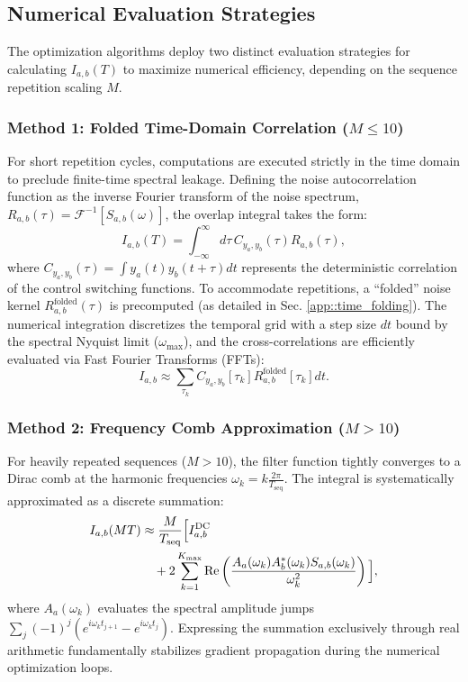 \documentclass[%
 reprint,
superscriptaddress,
 amsmath,amssymb,
 aps,
pra,
floatfix,
]{revtex4-2}
\begin{document}
\subsection{Numerical Evaluation Strategies}
The optimization algorithms deploy two distinct evaluation strategies for calculating $I_{a,b}(T)$ to maximize numerical efficiency, depending on the sequence repetition scaling $M$.

\subsubsection{Method 1: Folded Time-Domain Correlation ($M \le 10$)}
For short repetition cycles, computations are executed strictly in the time domain to preclude finite-time spectral leakage. Defining the noise autocorrelation function as the inverse Fourier transform of the noise spectrum, $R_{a,b}(\tau) = \mathcal{F}^{-1}[S_{a,b}(\omega)]$, the overlap integral takes the form:
\begin{equation}
    I_{a,b}(T) = \int_{-\infty}^{\infty} d\tau \, C_{y_a, y_b}(\tau) R_{a,b}(\tau),
\end{equation}
where $C_{y_a, y_b}(\tau) = \int y_a(t) y_b(t+\tau) dt$ represents the deterministic correlation of the control switching functions. To accommodate repetitions, a ``folded'' noise kernel $R^{\text{folded}}_{a,b}(\tau)$ is precomputed (as detailed in Sec. \ref{app::time_folding}). The numerical integration discretizes the temporal grid with a step size $dt$ bound by the spectral Nyquist limit ($\omega_{\max}$), and the cross-correlations are efficiently evaluated via Fast Fourier Transforms (FFTs):
\begin{equation}
    I_{a,b} \approx \sum_{\tau_k} C_{y_a, y_b}[\tau_k] R^{\text{folded}}_{a,b}[\tau_k] dt.
\end{equation}

\subsubsection{Method 2: Frequency Comb Approximation ($M > 10$)}
For heavily repeated sequences ($M > 10$), the filter function tightly converges to a Dirac comb at the harmonic frequencies $\omega_k = k \frac{2\pi}{T_{\text{seq}}}$. The integral is systematically approximated as a discrete summation:
\begin{align}
    I_{a,b}(MT) &\approx \frac{M}{T_{\text{seq}}} \Big[ I^{\text{DC}}_{a,b} \notag\\
    &\quad+ 2 \sum_{k=1}^{K_{\max}} \text{Re}\left( \frac{A_a(\omega_k) A_b^*(\omega_k) S_{a,b}(\omega_k)}{\omega_k^2} \right) \Big],
\end{align}
where $A_a(\omega_k)$ evaluates the spectral amplitude jumps $\sum_j (-1)^j (e^{i\omega_k t_{j+1}} - e^{i\omega_k t_j})$. Expressing the summation exclusively through real arithmetic fundamentally stabilizes gradient propagation during the numerical optimization loops.
\end{document}
